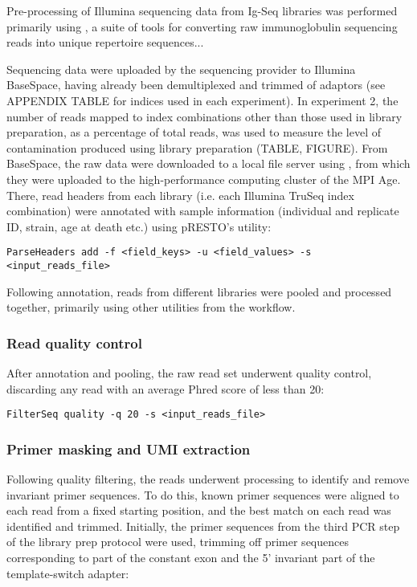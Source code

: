 Pre-processing of Illumina sequencing data from Ig-Seq libraries was performed primarily using , a suite of tools for converting raw immunoglobulin sequencing reads into unique repertoire sequences... %

Sequencing data were uploaded by the sequencing provider to Illumina BaseSpace, having already been demultiplexed and trimmed of adaptors (see APPENDIX TABLE for indices used in each experiment). In experiment 2, the number of reads mapped to index combinations other than those used in library preparation, as a percentage of total reads, was used to measure the level of contamination produced using library preparation (TABLE, FIGURE). From BaseSpace, the raw data were downloaded to a local file server using , from which they were uploaded to the high-performance computing cluster of the MPI Age. There, read headers from each library (i.e. each Illumina TruSeq index combination) were annotated with sample information (individual and replicate ID, strain, age at death etc.) using pRESTO's  utility:

\begin{lstlisting}
ParseHeaders add -f <field_keys> -u <field_values> -s <input_reads_file>
\end{lstlisting}

Following annotation, reads from different libraries were pooled and processed together, primarily using other utilities from the  workflow.

\subsubsection{Read quality control}

After annotation and pooling, the raw read set underwent quality control, discarding any read with an average Phred score of less than 20:

\begin{lstlisting}
FilterSeq quality -q 20 -s <input_reads_file>
\end{lstlisting}

\subsubsection{Primer masking and UMI extraction}

Following quality filtering, the reads underwent processing to identify and remove invariant primer sequences. To do this, known primer sequences were aligned to each read from a fixed starting position, and the best match on each read was identified and trimmed. Initially, the primer sequences from the third PCR step of the library prep protocol were used, trimming off primer sequences corresponding to part of the constant  exon and the 5' invariant part of the template-switch adapter:


